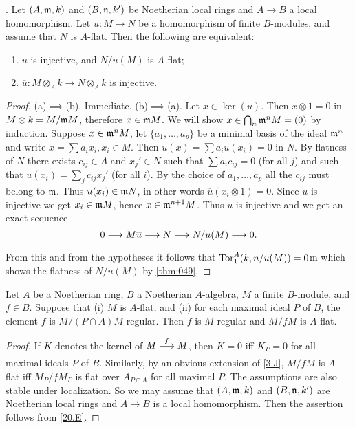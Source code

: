 \documentclass[../main]{subfiles}
\begin{document}
\begin{parapplication}. Let $(A,\mathfrak{m}, k)$ and $(B,\mathfrak{n}, k')$ be Noetherian local rings and $A\longrightarrow B$ a local homomorphism. Let $u\colon M\longrightarrow N$ be a homomorphism of finite $B$-modules, and assume that $N$ is $A$-flat. Then the following are equivalent: \begin{enumerate}[label=(\alph*)]
    \item $u$ is injective, and $N/u(M)$ is $A$-flat;
    \item $\overline{u}\colon M\otimes_A k\longrightarrow N\otimes_A k$ is injective.
\end{enumerate} \end{parapplication}
\begin{proof} (a)$\implies$(b). Immediate. (b)$\implies$(a). Let $x\in \ker(u)$. Then $x\otimes 1= 0$ in $M\otimes k = M/\mathfrak{m} M$, therefore $x\in \mathfrak{m} M$. We will show $x\in \bigcap_n \mathfrak{m}^n M = (0)$ by induction. Suppose $x\in \mathfrak{m}^n M$, let $\{a_1,\dots,a_p\}$ be a minimal basis of the ideal $\mathfrak{m}^n$ and write $x = \sum a_ix_i, x_i\in M$. Then $u(x) = \sum a_i u(x_i) = 0$ in $N$. By flatness of $N$ there exists $c_{ij}\in A$ and $x_j'\in N$ such that $\sum a_ic_{ij} = 0$ (for all $j$) and such that $u(x_i) = \sum_j c_{ij}x_j'$ (for all $i$). By the choice of $a_1,\dots,a_p$ all the $c_{ij}$ must belong to $\mathfrak{m}$. Thus $u(x_i)\in \mathfrak{m} N$, in other words $\overline{u}(x_i\otimes 1) = 0$. Since $u$ is injective we get $x_i\in \mathfrak{m} M$, hence $x\in \mathfrak{m}^{n+1} M$. Thus $u$ is injective and we get an exact sequence \[0\varrightarrow{}M\overline{u} \varrightarrow{}N\varrightarrow{} N/u(M)\varrightarrow{} 0.\] From this and from the hypotheses it follows that $\operatorname{Tor}_1^A(k,n/u(M)) = 0$m which shows the flatness of $N/u(M)$ by \ref{thm:049}.
\end{proof}

\begin{parcorollary} Let $A$ be a Noetherian ring, $B$ a Noetherian $A$-algebra, $M$ a finite $B$-module, and $f\in B$. Suppose that (i) $M$ is $A$-flat, and (ii) for each maximal ideal $P$ of $B$, the element $f$ is $M/(P\cap A)M$-regular. Then $f$ is $M$-regular and $M/fM$ is $A$-flat.\end{parcorollary}
\begin{proof}
If $K$ denotes the kernel of $M\varrightarrow{f} M$, then $K = 0$ iff $K_P = 0$ for all maximal ideals $P$ of $B$. Similarly, by an obvious extension of \ref{3.J}, $M/fM$ is $A$-flat iff $M_P/fM_P$ is flat over $A_{P\cap A}$ for all maximal $P$. The assumptions are also stable under localization. So we may assume that $(A,\mathfrak{m}, k)$ and $(B,\mathfrak{n}, k')$ are Noetherian local rings and $A\longrightarrow B$ is a local homomorphism. Then the assertion follows from \ref{20.E}.
\end{proof}
\end{document}
